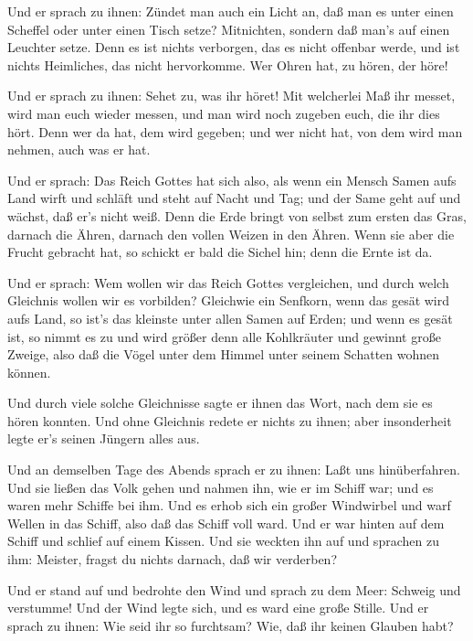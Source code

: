  Und er sprach zu ihnen: Zündet man auch ein Licht an, daß
man es unter einen Scheffel oder unter einen Tisch setze? Mitnichten,
sondern daß man's auf einen Leuchter setze.  Denn es ist
nichts verborgen, das es nicht offenbar werde, und ist nichts
Heimliches, das nicht hervorkomme.  Wer Ohren hat, zu
hören, der höre!

 Und er sprach zu ihnen: Sehet zu, was ihr höret! Mit
welcherlei Maß ihr messet, wird man euch wieder messen, und man wird
noch zugeben euch, die ihr dies hört.  Denn wer da hat, dem
wird gegeben; und wer nicht hat, von dem wird man nehmen, auch was er
hat.

 Und er sprach: Das Reich Gottes hat sich also, als wenn
ein Mensch Samen aufs Land wirft  und schläft und steht auf
Nacht und Tag; und der Same geht auf und wächst, daß er's nicht weiß.
 Denn die Erde bringt von selbst zum ersten das Gras,
darnach die Ähren, darnach den vollen Weizen in den Ähren. 
Wenn sie aber die Frucht gebracht hat, so schickt er bald die Sichel
hin; denn die Ernte ist da.

 Und er sprach: Wem wollen wir das Reich Gottes
vergleichen, und durch welch Gleichnis wollen wir es vorbilden?
 Gleichwie ein Senfkorn, wenn das gesät wird aufs Land, so
ist's das kleinste unter allen Samen auf Erden;  und wenn
es gesät ist, so nimmt es zu und wird größer denn alle Kohlkräuter und
gewinnt große Zweige, also daß die Vögel unter dem Himmel unter seinem
Schatten wohnen können.

 Und durch viele solche Gleichnisse sagte er ihnen das
Wort, nach dem sie es hören konnten.  Und ohne Gleichnis
redete er nichts zu ihnen; aber insonderheit legte er's seinen Jüngern
alles aus.

 Und an demselben Tage des Abends sprach er zu ihnen: Laßt
uns hinüberfahren.  Und sie ließen das Volk gehen und
nahmen ihn, wie er im Schiff war; und es waren mehr Schiffe bei ihm.
 Und es erhob sich ein großer Windwirbel und warf Wellen in
das Schiff, also daß das Schiff voll ward.  Und er war
hinten auf dem Schiff und schlief auf einem Kissen. Und sie weckten ihn
auf und sprachen zu ihm: Meister, fragst du nichts darnach, daß wir
verderben?

 Und er stand auf und bedrohte den Wind und sprach zu dem
Meer: Schweig und verstumme! Und der Wind legte sich, und es ward eine
große Stille.  Und er sprach zu ihnen: Wie seid ihr so
furchtsam? Wie, daß ihr keinen Glauben habt?

